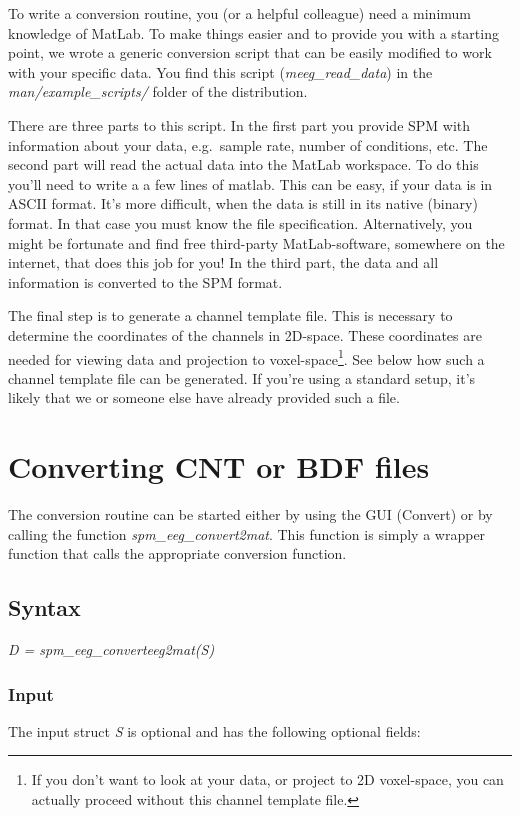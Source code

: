 To write a conversion routine, you (or a helpful colleague) need a
minimum knowledge of MatLab. To make things easier and to provide you
with a starting point, we wrote a generic conversion script that can
be easily modified to work with your specific data. You find this
script (\textit{meeg\_read\_data}) in the \textit{man/example\_scripts/}
folder of the distribution.

There are three parts to this script. In the first part you provide SPM
with information about your data, e.g.~sample rate, 
number of conditions, etc. The second part will read the actual data
into the MatLab workspace. To do this you'll need to write a a few 
lines of matlab. This can be easy, if your data is in ASCII
format. It's more difficult, when the data is still in its native (binary)
format. In that case you must know the file specification. Alternatively, you 
might be fortunate and find free third-party MatLab-software, somewhere on
the internet, that does this job for you! In the third part, the data
and all information is converted to the SPM format.

The final step is to generate a channel template
file. This is necessary to determine the coordinates of the channels
in 2D-space. These coordinates are needed for viewing data and
projection to voxel-space\footnote{If you don't want to look at your
  data, or project to 2D voxel-space, you can actually proceed without
  this channel template file.}. See below how such a channel template file
can be generated. If you're using a standard setup, it's likely that
we or someone else have already provided such a file.

\section{Converting CNT or BDF files}
The conversion routine can be started either by using the GUI
(Convert) or by calling the function \textit{spm\_eeg\_convert2mat}.
This function is simply a wrapper function that calls the appropriate
conversion function.

\subsection{Syntax}
\textit{D = spm\_eeg\_converteeg2mat(S)}
\\

\subsubsection{Input}
The input struct {\it S} is optional and has the following optional fields:


